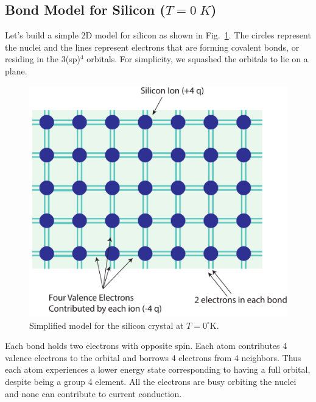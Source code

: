 \subsection{Bond Model for Silicon (\texorpdfstring{$T=0\;K$}{T=0K})}
Let's build a simple 2D model for silicon as shown in Fig.~\ref{fig:silicon_model}.  The circles represent the nuclei and the lines represent electrons that are forming covalent bonds, or residing in the 3(sp)$^4$ orbitals.  For simplicity, we squashed the orbitals to lie on a plane.
\begin{figure}[tb]
\centering
\includegraphics[width=.65\columnwidth]{silicon_model}
\caption{Simplified model for the  silicon crystal at $T=0^\circ$K.}
\label{fig:silicon_model}
\end{figure}

Each bond holds two electrons with opposite spin.  Each atom contributes 4 valence electrons to the orbital and borrows 4 electrons from 4 neighbors.  Thus each atom experiences a lower energy state corresponding to having a full orbital, despite being a group 4 element.  All the electrons are busy orbiting the nuclei and none can contribute to current conduction.

